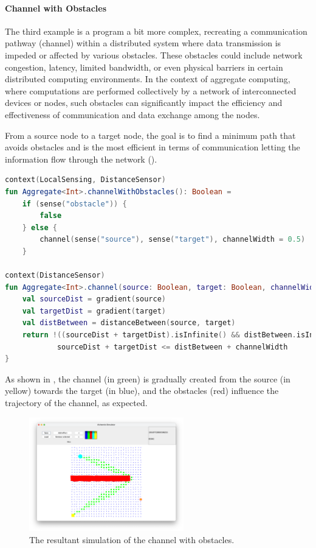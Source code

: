 \paragraph{Channel with Obstacles}
The third example is a program a bit more complex, recreating a communication pathway (channel) within a distributed
system where data transmission is impeded or affected by various obstacles.
These obstacles could include network congestion, latency, limited bandwidth, or even physical barriers in certain
distributed computing environments.
In the context of aggregate computing, where computations are performed collectively by a network of interconnected
devices or nodes, such obstacles can significantly impact the efficiency and effectiveness of communication and data exchange among the nodes.

From a source node to a target node, the goal is to find a minimum path that avoids obstacles and is the most efficient
in terms of communication letting the information flow through the network ().

\begin{lstlisting}[language=kt, caption={Channel with Obstacles code example}, label={lst:channel-with-obstacles-example}]
context(LocalSensing, DistanceSensor)
fun Aggregate<Int>.channelWithObstacles(): Boolean =
    if (sense("obstacle")) {
        false
    } else {
        channel(sense("source"), sense("target"), channelWidth = 0.5)
    }

context(DistanceSensor)
fun Aggregate<Int>.channel(source: Boolean, target: Boolean, channelWidth: Double): Boolean {
    val sourceDist = gradient(source)
    val targetDist = gradient(target)
    val distBetween = distanceBetween(source, target)
    return !((sourceDist + targetDist).isInfinite() && distBetween.isInfinite()) &&
            sourceDist + targetDist <= distBetween + channelWidth
}
\end{lstlisting}

As shown in , the channel (in green) is gradually created from the source (in yellow) towards the
target (in blue), and the obstacles (red) influence the trajectory of the channel, as expected.

\begin{figure}[ht!]
    \centering
    \includegraphics[width=0.6\textwidth]{figures/channel}
    \caption{The resultant simulation of the channel with obstacles.}
    \label{fig:channel}
\end{figure}

